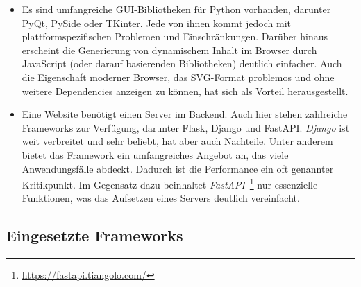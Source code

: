\begin{itemize}
    \item Es sind umfangreiche GUI-Bibliotheken für Python vorhanden, darunter PyQt, PySide oder TKinter. Jede von ihnen kommt jedoch mit plattformspezifischen Problemen und Einschränkungen.
    Darüber hinaus erscheint die Generierung von dynamischem Inhalt im Browser durch JavaScript (oder darauf basierenden Bibliotheken) deutlich einfacher. Auch die Eigenschaft moderner Browser,
    das SVG-Format problemos und ohne weitere Dependencies anzeigen zu können, hat sich als Vorteil herausgestellt.
    \item Eine Website benötigt einen Server im Backend. Auch hier stehen zahlreiche Frameworks zur Verfügung, darunter Flask, Django und FastAPI.
    \textit{Django} ist weit verbreitet und sehr beliebt, hat aber auch Nachteile. Unter anderem bietet das Framework ein umfangreiches Angebot an, das viele Anwendungsfälle abdeckt.
    Dadurch ist die Performance ein oft genannter Kritikpunkt. 
    Im Gegensatz dazu beinhaltet \textit{FastAPI}~\footnote{\hspace{1.5mm}\url{https://fastapi.tiangolo.com/}} nur essenzielle Funktionen, was das Aufsetzen eines Servers deutlich vereinfacht.
\end{itemize}

\subsection{Eingesetzte Frameworks}

